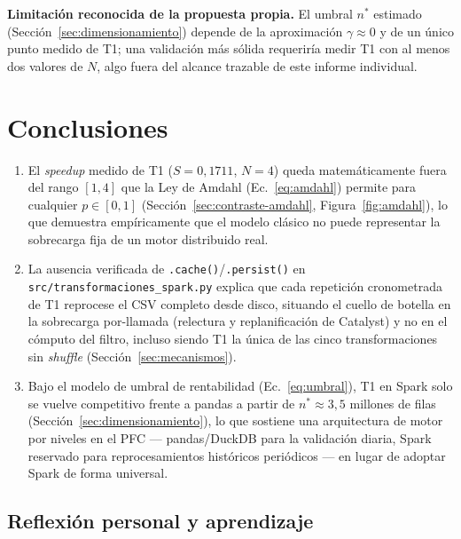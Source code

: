 \documentclass[11pt,a4paper]{article}
\begin{document}
\textbf{Limitaci\'on reconocida de la propuesta propia.} El umbral $n^{*}$ estimado
(Secci\'on~\ref{sec:dimensionamiento}) depende de la aproximaci\'on $\gamma\approx 0$ y de un
\'unico punto medido de T1; una validaci\'on m\'as s\'olida requerir\'ia medir T1 con al menos
dos valores de $N$, algo fuera del alcance trazable de este informe individual.

\section{Conclusiones}

\begin{enumerate}
  \item El \textit{speedup} medido de T1 ($S=0{,}1711$, $N=4$) queda matem\'aticamente fuera
  del rango $[1,4]$ que la Ley de Amdahl (Ec.~\eqref{eq:amdahl}) permite para cualquier
  $p\in[0,1]$ (Secci\'on~\ref{sec:contraste-amdahl}, Figura~\ref{fig:amdahl}), lo que demuestra
  emp\'iricamente que el modelo cl\'asico no puede representar la sobrecarga fija de un motor
  distribuido real.
  \item La ausencia verificada de \texttt{.\allowbreak{}cache()}/\texttt{.\allowbreak{}persist()} en
  \texttt{src/\allowbreak{}transformaciones\_spark.\allowbreak{}py} explica que cada repetici\'on cronometrada de T1
  reprocese el CSV completo desde disco, situando el cuello de botella en la sobrecarga
  por-llamada (relectura y replanificaci\'on de Catalyst) y no en el c\'omputo del filtro,
  incluso siendo T1 la \'unica de las cinco transformaciones sin \textit{shuffle}
  (Secci\'on~\ref{sec:mecanismos}).
  \item Bajo el modelo de umbral de rentabilidad (Ec.~\eqref{eq:umbral}), T1 en Spark solo se
  vuelve competitivo frente a pandas a partir de $n^{*}\approx 3{,}5$ millones de filas
  (Secci\'on~\ref{sec:dimensionamiento}), lo que sostiene una arquitectura de motor por niveles
  en el PFC --- pandas/DuckDB para la validaci\'on diaria, Spark reservado para
  reprocesamientos hist\'oricos peri\'odicos --- en lugar de adoptar Spark de forma universal.
\end{enumerate}

\subsection{Reflexi\'on personal y aprendizaje}
\end{document}
